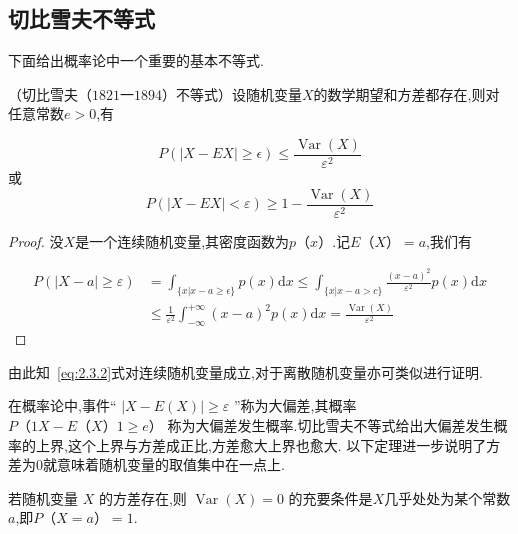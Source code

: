 \subsection{切比雪夫不等式}

下面给出概率论中一个重要的基本不等式.

\begin{theorem}{}{}
	（切比雪夫$ （1821一1894） $不等式）设随机变量$ X $的数学期望和方差都存在,则对任意常数$ e>0 $,有
	
	\begin{equation}
	P(|X-E X| \geqslant \epsilon) \leqslant \frac{\operatorname{Var}(X)}{\varepsilon^{2}} \label{eq:2.3.2}
	\end{equation}
	或
	\begin{equation}
	P(|X-E X|<\varepsilon) \geqslant 1-\frac{\operatorname{Var}(X)}{\varepsilon^{2}} \label{eq:2.3.3}
	\end{equation}
\end{theorem}

\begin{proof}
	没$ X $是一个连续随机变量,其密度函数为$ p（x） $.记$ E（X）=a $,我们有
	
	\[
	\begin{array}{ll}
	{P(|X-a| \geqslant \varepsilon)} & {=\int_{\{x | x-a \geq \epsilon\}} p(x) \mathrm{d} x \leq \int_{\{x | x-a>c\}} \frac{(x-a)^{2}}{\varepsilon^{2}} p(x) \mathrm{d} x} \\ 
	{} & {\leqslant \frac{1}{\varepsilon^{2}} \int_{-\infty}^{+\infty}(x-a)^{2} p(x) \mathrm{d} x=\frac{\operatorname{Var}(X)}{\varepsilon^{2}}}
	\end{array}
	\] 
\end{proof}

由此知~\ref{eq:2.3.2}式对连续随机变量成立,对于离散随机变量亦可类似进行证明.

在概率论中,事件“ $|X-E(X)| \geqslant \varepsilon$ ”称为大偏差,其概率 $ P（1X-E（X）1 \geqslant e） $ 称为大偏差发生概率.切比雪夫不等式给出大偏差发生概率的上界,这个上界与方差成正比,方差愈大上界也愈大.
以下定理进一步说明了方差为0就意味着随机变量的取值集中在一点上.

\begin{theorem}{}{}
	若随机变量 $X$ 的方差存在,则 $\operatorname{Var}(X)=0$ 的充要条件是$ X $几乎处处为某个常数$ a $,即$ P（X=a）=1 $.
\end{theorem}


